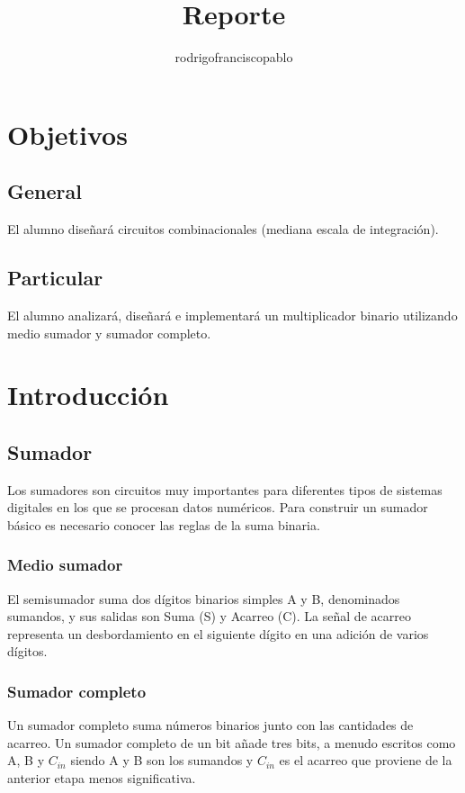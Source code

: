 \documentclass{mylib/reporteConCalif}
\title{Reporte}
\author{rodrigofranciscopablo }
\begin{document}
\coverPage

\section{Objetivos}

\subsection{General}

El alumno diseñará circuitos combinacionales (mediana escala de integración).

\subsection{Particular}

El alumno analizará, diseñará e implementará un multiplicador binario utilizando medio sumador y
sumador completo.

\section{Introducción}

\subsection{Sumador}
Los sumadores son circuitos muy importantes para diferentes tipos de sistemas digitales en los que se procesan datos numéricos. Para construir un sumador básico es necesario conocer las reglas de la suma binaria. 

\subsubsection{Medio sumador}

El semisumador suma dos dígitos binarios simples A y B, denominados sumandos, y sus salidas son Suma (S) y Acarreo (C). La señal de acarreo representa un desbordamiento en el siguiente dígito en una adición de varios dígitos. 

\subsubsection{Sumador completo}
Un sumador completo suma números binarios junto con las cantidades de acarreo. Un sumador completo de un bit añade tres bits, a menudo escritos como A, B y $C_{in}$ siendo A y B son los sumandos y $C_{in}$ es el acarreo que proviene de la anterior etapa menos significativa.
\end{document}

